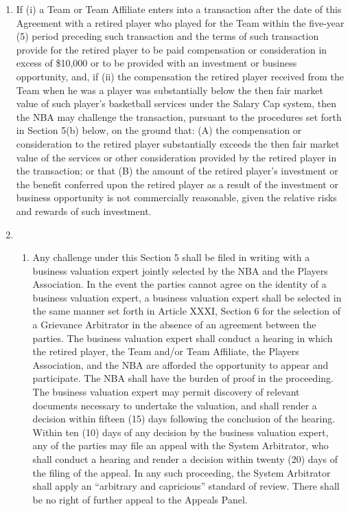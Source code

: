\documentclass[
]{book}
\providecommand{\tightlist}{%
  \setlength{\itemsep}{0pt}\setlength{\parskip}{0pt}}
\begin{document}
\begin{enumerate}
\def\labelenumi{(\alph{enumi})}
\item
  If (i) a Team or Team Affiliate enters into a transaction after the date of this Agreement with a retired player who played for the Team within the five-year (5) period preceding such transaction and the terms of such transaction provide for the retired player to be paid compensation or consideration in excess of \$10,000 or to be provided with an investment or business opportunity, and, if (ii) the compensation the retired player received from the Team when he was a player was substantially below the then fair market value of such player's basketball services under the Salary Cap system, then the NBA may challenge the transaction, pursuant to the procedures set forth in Section 5(b) below, on the ground that: (A) the compensation or consideration to the retired player substantially exceeds the then fair market value of the services or other consideration provided by the retired player in the transaction; or that (B) the amount of the retired player's investment or the benefit conferred upon the retired player as a result of the investment or business opportunity is not commercially reasonable, given the relative risks and rewards of such investment.
\item
  \begin{enumerate}
  \def\labelenumii{(\roman{enumii})}
  \tightlist
  \item
    Any challenge under this Section 5 shall be filed in writing with a business valuation expert jointly selected by the NBA and the Players Association. In the event the parties cannot agree on the identity of a business valuation expert, a business valuation expert shall be selected in the same manner set forth in Article XXXI, Section 6 for the selection of a Grievance Arbitrator in the absence of an agreement between the parties. The business valuation expert shall conduct a hearing in which the retired player, the Team and/or Team Affiliate, the Players Association, and the NBA are afforded the opportunity to appear and participate. The NBA shall have the burden of proof in the proceeding. The business valuation expert may permit discovery of relevant documents necessary to undertake the valuation, and shall render a decision within fifteen (15) days following the conclusion of the hearing. Within ten (10) days of any decision by the business valuation expert, any of the parties may file an appeal with the System Arbitrator, who shall conduct a hearing and render a decision within twenty (20) days of the filing of the appeal. In any such proceeding, the System Arbitrator shall apply an ``arbitrary and capricious'' standard of review. There shall be no right of further appeal to the Appeals Panel.

\end{enumerate}
\end{enumerate}
\end{document}
